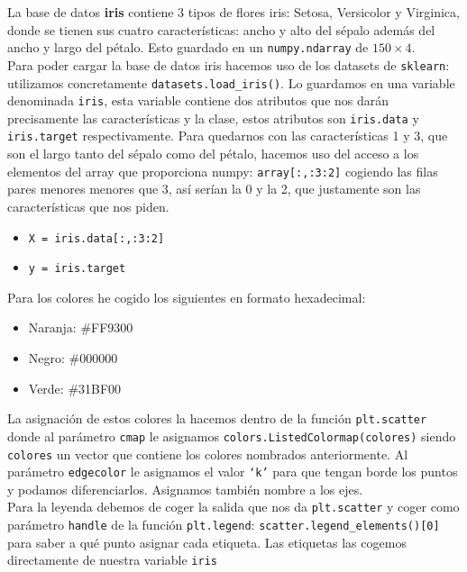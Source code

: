 \documentclass[11pt,a4paper]{report}
\begin{document}
La base de datos \textbf{iris} contiene 3 tipos de flores iris: Setosa, Versicolor y Virginica, donde se tienen sus cuatro características: ancho y alto del sépalo además del ancho y largo del pétalo. Esto guardado en un \texttt{numpy.ndarray} de $150\times4$.\\

Para poder cargar la base de datos iris hacemos uso de los datasets de \texttt{sklearn}: utilizamos concretamente \texttt{datasets.load\_iris()}. Lo guardamos en una variable denominada \texttt{iris}, esta variable contiene dos atributos que nos darán precisamente las características y la clase, estos atributos son \texttt{iris.data} y \texttt{iris.target} respectivamente. Para quedarnos con las características 1 y 3, que son el largo tanto del sépalo como del pétalo, hacemos uso del acceso a los elementos del array que proporciona numpy: \texttt{array[:,:3:2]} cogiendo las filas pares menores menores que 3, así serían la 0 y la 2, que justamente son las características que nos piden.
\begin{itemize}
\item \texttt{X = iris.data[:,:3:2]}
\item \texttt{y = iris.target}
\end{itemize} 
Para los colores he cogido los siguientes en formato hexadecimal:
\begin{itemize}
\item Naranja: \#FF9300
\item Negro: \#000000
\item Verde: \#31BF00
\end{itemize}
La asignación de estos colores la hacemos dentro de la función \texttt{plt.scatter} donde al parámetro \texttt{cmap} le asignamos \texttt{colors.ListedColormap(colores)} siendo \texttt{colores} un vector que contiene los colores nombrados anteriormente. Al parámetro \texttt{edgecolor} le asignamos el valor \texttt{`k'} para que tengan borde los puntos y podamos diferenciarlos. Asignamos también nombre a los ejes.\\

Para la leyenda debemos de coger la salida que nos da \texttt{plt.scatter} y coger como parámetro \texttt{handle} de la función \texttt{plt.legend}: \texttt{scatter.legend\_elements()[0]} para saber a qué punto asignar cada etiqueta. Las etiquetas las cogemos directamente de nuestra variable \texttt{iris}\\
\end{document}
